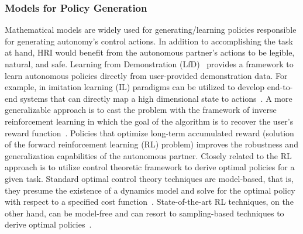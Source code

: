 \documentclass[12pt]{article}
\begin{document}
\subsubsection{Models for Policy Generation}

Mathematical models are widely used for generating/learning policies responsible for generating autonomy's control actions. In addition to accomplishing the task at hand, HRI would benefit from the autonomous partner's actions to be legible, natural, and safe. Learning from Demonstration (LfD)~\cite{argall2009survey} provides a framework to learn autonomous policies directly from user-provided demonstration data. For example, in imitation learning (IL) paradigms can be utilized to develop end-to-end systems that can directly map a high dimensional state to actions~\cite{bojarski2016end}. A more generalizable approach is to cast the problem with the framework of inverse reinforcement learning in which the goal of the algorithm is to recover the user's reward function~\cite{ziebart2008maximum}.  Policies that optimize long-term accumulated reward (solution of the forward reinforcement learning (RL) problem) improves the robustness and generalization capabilities of the autonomous partner. Closely related to the RL approach is to utilize control theoretic framework to derive optimal policies for a given task. Standard optimal control theory techniques are model-based, that is, they presume the existence of a dynamics model and solve for the optimal policy with respect to a specified cost function~\cite{kirk1970optimal}. State-of-the-art RL techniques, on the other hand, can be model-free and can resort to sampling-based techniques to derive optimal policies~\cite{watkins1992q}. 
\end{document}
